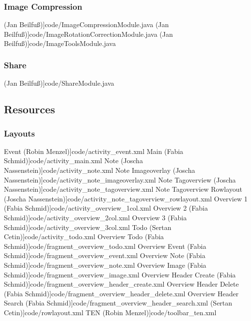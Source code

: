 	\subsubsection{Image Compression}
 (Jan Beilfuß)]{code/ImageCompressionModule.java}
 (Jan Beilfuß)]{code/ImageRotationCorrectionModule.java}
 (Jan Beilfuß)]{code/ImageToolsModule.java}
	\subsubsection{Share}
 (Jan Beilfuß)]{code/ShareModule.java}

\lstset{language=XML}
\subsection{Resources}
	\subsubsection{Layouts}
 Event (Robin Menzel)]{code/activity_event.xml}
 Main (Fabia Schmid)]{code/activity_main.xml}
 Note (Joscha Nassenstein)]{code/activity_note.xml}
 Note Imageoverlay (Joscha Nassenstein)]{code/activity_note_imageoverlay.xml}
 Note Tagoverview (Joscha Nassenstein)]{code/activity_note_tagoverview.xml}
 Note Tagoverview Rowlayout (Joscha Nassenstein)]{code/activity_note_tagoverview_rowlayout.xml}
 Overview 1 (Fabia Schmid)]{code/activity_overview_1col.xml}
 Overview 2 (Fabia Schmid)]{code/activity_overview_2col.xml}
 Overview 3 (Fabia Schmid)]{code/activity_overview_3col.xml}
 Todo (Sertan Cetin)]{code/activity_todo.xml}
 Overview Todo (Fabia Schmid)]{code/fragment_overview_todo.xml}
 Overview Event (Fabia Schmid)]{code/fragment_overview_event.xml}
 Overview Note (Fabia Schmid)]{code/fragment_overview_note.xml}
 Overview Image (Fabia Schmid)]{code/fragment_overview_image.xml}
 Overview Header Create (Fabia Schmid)]{code/fragment_overview_header_create.xml}
 Overview Header Delete (Fabia Schmid)]{code/fragment_overview_header_delete.xml}
 Overview Header Search (Fabia Schmid)]{code/fragment_overview_header_search.xml}
 (Sertan Cetin)]{code/rowlayout.xml}
 TEN (Robin Menzel)]{code/toolbar_ten.xml}
